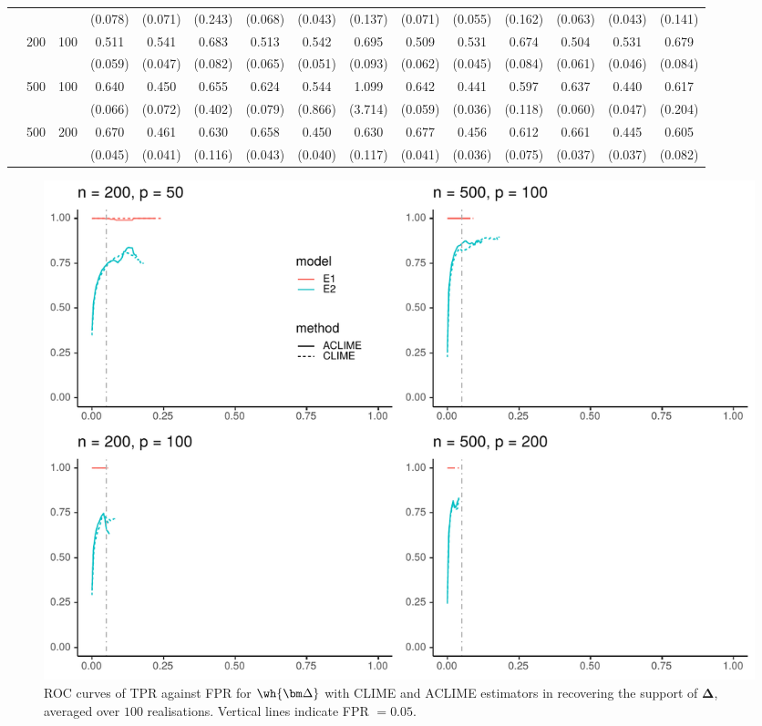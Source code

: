 \begin{table}[htbp]
{\begin{tabular}{ccc cccccc cccccc}
 &  &  & (0.078) & (0.071) & (0.243) & (0.068) & (0.043) & (0.137) & (0.071) & (0.055) & (0.162) & (0.063) & (0.043) & (0.141) \\
 & 200 & 100 & 0.511 & 0.541 & 0.683 & 0.513 & 0.542 & 0.695 & 0.509 & 0.531 & 0.674 & 0.504 & 0.531 & 0.679 \\
 &  &  & (0.059) & (0.047) & (0.082) & (0.065) & (0.051) & (0.093) & (0.062) & (0.045) & (0.084) & (0.061) & (0.046) & (0.084) \\
 & 500 & 100 & 0.640 & 0.450 & 0.655 & 0.624 & 0.544 & 1.099 & 0.642 & 0.441 & 0.597 & 0.637 & 0.440 & 0.617 \\
 &  &  & (0.066) & (0.072) & (0.402) & (0.079) & (0.866) & (3.714) & (0.059) & (0.036) & (0.118) & (0.060) & (0.047) & (0.204) \\
 & 500 & 200 & 0.670 & 0.461 & 0.630 & 0.658 & 0.450 & 0.630 & 0.677 & 0.456 & 0.612 & 0.661 & 0.445 & 0.605 \\
 &  &  & (0.045) & (0.041) & (0.116) & (0.043) & (0.040) & (0.117) & (0.041) & (0.036) & (0.075) & (0.037) & (0.037) & (0.082)\\	\bottomrule
\end{tabular}}
\end{table}

\begin{figure}[htbp]
\centering
\includegraphics[width = .8\textwidth]{figs/roc_delta_aclime.pdf}
\caption{\small ROC curves of TPR against FPR for
$\wh{\bm\Delta}$ with CLIME and ACLIME estimators
in recovering the support of $\bm\Delta$, averaged over $100$ realisations.
Vertical lines indicate FPR $= 0.05$.}
\label{fig:roc:delta}
\end{figure}

